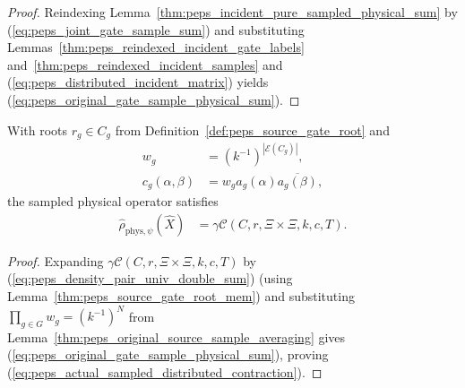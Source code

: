 \begin{proof}
    \leanok
    Reindexing Lemma~\ref{thm:peps_incident_pure_sampled_physical_sum} by (\ref{eq:peps_joint_gate_sample_sum}) and substituting Lemmas~\ref{thm:peps_reindexed_incident_gate_labels} and~\ref{thm:peps_reindexed_incident_samples} and (\ref{eq:peps_distributed_incident_matrix}) yields (\ref{eq:peps_original_gate_sample_physical_sum}).
\end{proof}

\begin{lemma}
    \label{thm:peps_actual_sampled_distributed_contraction}
    \leanok
    With roots $r_g\in C_g$ from Definition~\ref{def:peps_source_gate_root} and
    \begin{align}
        w_g               & =(k^{-1})^{|\mathcal E(C_g)|},         \\
        c_g(\alpha,\beta) & =w_g a_g(\alpha)\overline{a_g(\beta)},
        \label{eq:peps_actual_gate_weight}
    \end{align}
    the sampled physical operator satisfies
    \begin{align}
        \widehat\rho_{\mathrm{phys},\psi}(\widehat X)
         & =\gamma\mathcal C(C,r,\Xi\times\Xi,k,c,T).
        \label{eq:peps_actual_sampled_distributed_contraction}
    \end{align}
\end{lemma}

\begin{proof}
    \leanok
    Expanding $\gamma\mathcal C(C,r,\Xi\times\Xi,k,c,T)$ by (\ref{eq:peps_density_pair_univ_double_sum}) (using Lemma~\ref{thm:peps_source_gate_root_mem}) and substituting $\prod_{g\in G}w_g=(k^{-1})^N$ from Lemma~\ref{thm:peps_original_source_sample_averaging} gives (\ref{eq:peps_original_gate_sample_physical_sum}), proving (\ref{eq:peps_actual_sampled_distributed_contraction}).
\end{proof}
